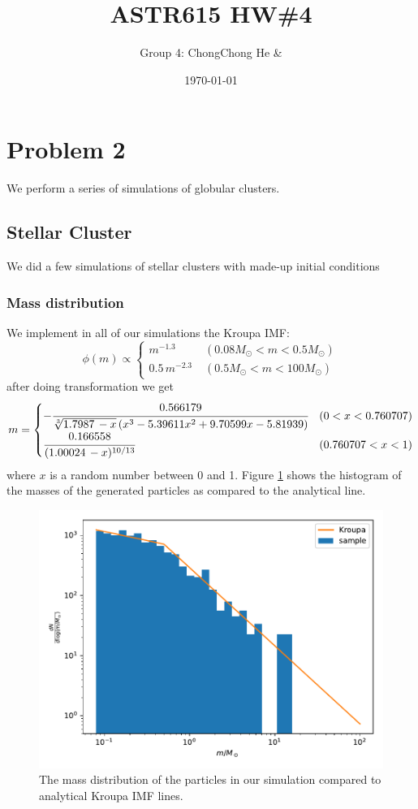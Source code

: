 
\usepackage{graphicx}



\title{ASTR615 HW\#4}
\author{Group 4: ChongChong He \& }
\date{\today}
\maketitle

\section*{Problem 2}
We perform a series of simulations of globular clusters.

\subsection*{Stellar Cluster}
We did a few simulations of stellar clusters with made-up initial conditions 

\subsubsection*{Mass distribution}
We implement in all of our simulations the Kroupa IMF:
\begin{equation}
\phi(m) \propto 
\begin{cases}
m^{-1.3} \; &(0.08M_\odot < m < 0.5M_\odot) \\
0.5 \, m^{-2.3} \; &(0.5M_\odot<m<100M_\odot)
\end{cases}
\end{equation}
after doing transformation we get
\begin{equation}
m=
	\begin{cases}
	-\cfrac{0.566179}{\sqrt[3]{1.7987\, - x} \left(x^3-5.39611 
	x^2+9.70599 x-5.81939\right)} & (0<x<0.760707) \\
	\cfrac{0.166558}{(1.00024\, -x)^{10/13}} & (0.760707<x<1)
	\end{cases}
\end{equation}
where $ x $ is a random number between 0 and 1. Figure \ref{fig:imf} shows the 
histogram of the masses of the generated particles as compared to the analytical line.
\begin{figure}[h]
	\centering
	\includegraphics[width=.6\columnwidth]{../simulations/imf.pdf}
	\caption{The mass distribution of the particles in our simulation compared to analytical 
	Kroupa IMF lines.}
	\label{fig:imf}
\end{figure}

